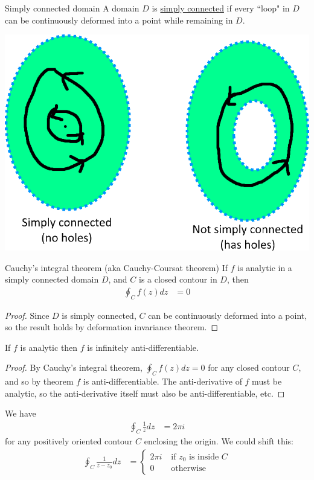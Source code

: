 \documentclass[12pt]{article}
\begin{document}
	\begin{mydef}{Simply connected domain}{}
		A domain $D$ is \underline{simply connected} if every ``loop" in $D$ can be continuously deformed into a point while remaining in $D$.
		
		\includegraphics[scale=0.7]{Notes2.png}
	\end{mydef}
	
	\begin{mythm}{Cauchy's integral theorem (aka Cauchy-Coursat theorem)}{}
		If $f$ is analytic in a simply connected domain $D$, and $C$ is a closed contour in $D$, then
		\begin{align*}
			\oint_Cf(z)dz&=0
		\end{align*}
		\begin{proof}
			Since $D$ is simply connected, $C$ can be continuously deformed into a point, so the result holds by deformation invariance theorem.
		\end{proof}
	\end{mythm}
	
	\begin{mycor}{}{}
		If $f$ is analytic then $f$ is infinitely anti-differentiable.
		\begin{proof}
			By Cauchy's integral theorem, $\oint_Cf(z)dz=0$ for any closed contour $C$, and so by theorem $f$ is anti-differentiable. The anti-derivative of $f$ must be analytic, so the anti-derivative itself must also be anti-differentiable, etc.
		\end{proof}
	\end{mycor}
	
	\begin{myex}{}{}
		We have
		\begin{align*}
			\oint_C\frac{1}{z}dz&=2\pi i
		\end{align*}
		for any positively oriented contour $C$ enclosing the origin. We could shift this:
		\begin{align*}
			\oint_C\frac{1}{z-z_0}dz&=\begin{cases}
				2\pi i&\;\text{if }z_0\text{ is inside }C\\
				0&\;\text{otherwise}
			\end{cases}
		\end{align*}
	\end{myex}
\end{document}
